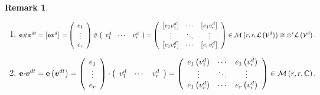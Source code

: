 \documentclass[aps,preprint]{revtex4}%
\newtheorem{remark}[theorem]{Remark}
\begin{document}
\begin{remark}
\begin{enumerate}
\begin{enumerate}
\item
\begin{equation}
\mathbf{e\#}\boldsymbol{v}^{dt}=\left[  \mathbf{e}\boldsymbol{v}^{d}\right]
=\left(
\begin{array}
[c]{c}%
e_{1}\\
\vdots\\
e_{r}%
\end{array}
\right)  \mathbf{\#}\left(
\begin{array}
[c]{ccc}%
v_{1}^{d} & \cdots & v_{r}^{d}%
\end{array}
\right)  =\left(
\begin{array}
[c]{ccc}%
\left[  e_{1}v_{1}^{d}\right]  & \cdots & \left[  e_{1}v_{r}^{d}\right] \\
\vdots & \ddots & \vdots\\
\left[  e_{1}v_{r}^{d}\right]  & \cdots & \left[  e_{r}v_{r}^{d}\right]
\end{array}
\right)  \in\mathcal{M}\left(  r,r,\mathcal{L}\left(  \mathcal{V}^{d}\right)
\right)  \cong\otimes^{r}\mathcal{L}\left(  \mathcal{V}^{d}\right)  .
\end{equation}


\item
\begin{equation}
\mathbf{e\cdot}\boldsymbol{v}^{dt}=\mathbf{e}\left(  \boldsymbol{v}%
^{dt}\right)  =\left(
\begin{array}
[c]{c}%
e_{1}\\
\vdots\\
e_{r}%
\end{array}
\right)  \cdot\left(
\begin{array}
[c]{ccc}%
v_{1}^{d} & \cdots & v_{r}^{d}%
\end{array}
\right)  =\left(
\begin{array}
[c]{ccc}%
e_{1}\left(  v_{1}^{d}\right)  & \cdots & e_{1}\left(  v_{r}^{d}\right) \\
\vdots & \ddots & \vdots\\
e_{1}\left(  v_{r}^{d}\right)  & \cdots & e_{r}\left(  v_{r}^{d}\right)
\end{array}
\right)  \in\mathcal{M}\left(  r,r,\mathbb{C}\right)  .
\end{equation}

\end{enumerate}
\end{enumerate}
\end{remark}
\end{document}
